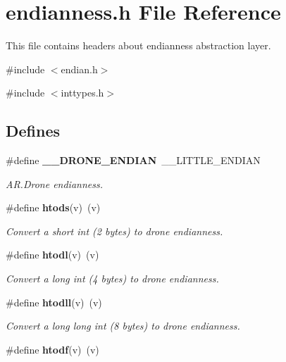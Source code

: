 \section{endianness.h File Reference}
\label{endianness_8h}


This file contains headers about endianness abstraction layer.  


{\ttfamily \#include $<$endian.h$>$}\par
{\ttfamily \#include $<$inttypes.h$>$}\par
\subsection*{Defines}
\begin{DoxyCompactItemize}
\item 
\#define {\bf \_\-\_\-DRONE\_\-ENDIAN}~\_\-\_\-LITTLE\_\-ENDIAN\label{endianness_8h_a356e9a003a0667c226da620bec09bf53}

\begin{DoxyCompactList}\small\item\em AR.Drone endianness. \item\end{DoxyCompactList}\item 
\#define {\bf htods}(v)~(v)\label{endianness_8h_ac7beb99d5071e786fb91b66757f60c92}

\begin{DoxyCompactList}\small\item\em Convert a short int (2 bytes) to drone endianness. \item\end{DoxyCompactList}\item 
\#define {\bf htodl}(v)~(v)\label{endianness_8h_a79d4095664c7e26e6d1ae7d3d5194307}

\begin{DoxyCompactList}\small\item\em Convert a long int (4 bytes) to drone endianness. \item\end{DoxyCompactList}\item 
\#define {\bf htodll}(v)~(v)\label{endianness_8h_a922c50637fb9e840d292918b621f7689}

\begin{DoxyCompactList}\small\item\em Convert a long long int (8 bytes) to drone endianness. \item\end{DoxyCompactList}\item 
\#define {\bf htodf}(v)~(v)\label{endianness_8h_aa86df99d3d413929f8528a342abe9c53}


\end{DoxyCompactItemize}
